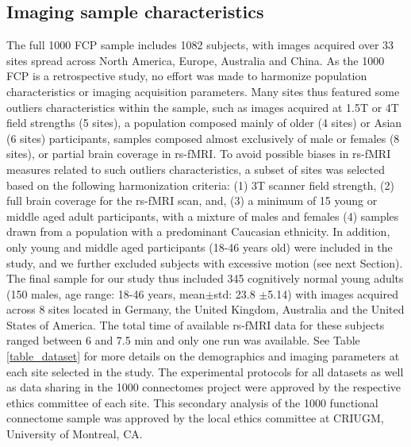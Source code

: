 \documentclass[authoryear]{elsarticle}
\begin{document}
\subsection{Imaging sample characteristics}
The full 1000 FCP sample includes 1082 subjects, with images acquired over 33 sites spread across North America, Europe, Australia and China. As the 1000 FCP is a retrospective study, no effort was made to harmonize population characteristics or imaging acquisition parameters. Many sites thus featured some outliers characteristics within the sample, such as images acquired at 1.5T or 4T field strengths (5 sites), a population composed mainly of older (4 sites) or Asian (6 sites) participants, samples composed almost exclusively of male or females (8 sites), or partial brain coverage in rs-fMRI. To avoid possible biases in rs-fMRI measures related to such outliers characteristics, a subset of sites was selected based on the following harmonization criteria: (1) 3T scanner field strength, (2) full brain coverage for the rs-fMRI scan, and, (3) a minimum of 15 young or middle aged adult participants, with a mixture of males and females (4) samples drawn from a population with a predominant Caucasian ethnicity. In addition, only young and middle aged participants (18-46 years old) were included in the study, and we further excluded subjects with excessive motion (see next Section). The final sample for our study thus included 345 cognitively normal young adults (150 males, age range: 18-46 years, mean$\pm$std: 23.8 $\pm$5.14) with images acquired across 8 sites located in Germany, the United Kingdom, Australia and the United States of America. The total time of available rs-fMRI data for these subjects ranged between 6 and 7.5 min and only one run was available. See Table \ref{table_dataset} for more details on the demographics and imaging parameters at each site selected in the study. The experimental protocols for all datasets as well as data sharing in the 1000 connectomes project were approved by the respective ethics committee of each site. This secondary analysis of the 1000 functional connectome sample was approved by the local ethics committee at CRIUGM, University of Montreal, CA.

 
\end{document}
